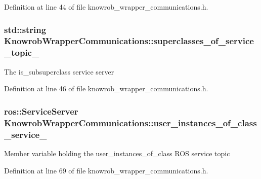 Definition at line 44 of file knowrob\-\_\-wrapper\-\_\-communications.\-h.

\hypertarget{classKnowrobWrapperCommunications_aeed7bc627032586a30f7405ed7450dc2}{
\subsubsection[{superclasses\-\_\-of\-\_\-service\-\_\-topic\-\_\-}]{\setlength{\rightskip}{0pt plus 5cm}std\-::string Knowrob\-Wrapper\-Communications\-::superclasses\-\_\-of\-\_\-service\-\_\-topic\-\_\-\hspace{0.3cm}{\ttfamily [private]}}}\label{classKnowrobWrapperCommunications_aeed7bc627032586a30f7405ed7450dc2}
The is\-\_\-subsuperclass service server 

Definition at line 46 of file knowrob\-\_\-wrapper\-\_\-communications.\-h.

\hypertarget{classKnowrobWrapperCommunications_a135ffaafe3229f5208de0622430fa9b6}{
\subsubsection[{user\-\_\-instances\-\_\-of\-\_\-class\-\_\-service\-\_\-}]{\setlength{\rightskip}{0pt plus 5cm}ros\-::\-Service\-Server Knowrob\-Wrapper\-Communications\-::user\-\_\-instances\-\_\-of\-\_\-class\-\_\-service\-\_\-\hspace{0.3cm}{\ttfamily [private]}}}\label{classKnowrobWrapperCommunications_a135ffaafe3229f5208de0622430fa9b6}
Member variable holding the user\-\_\-instances\-\_\-of\-\_\-class R\-O\-S service topic 

Definition at line 69 of file knowrob\-\_\-wrapper\-\_\-communications.\-h.

